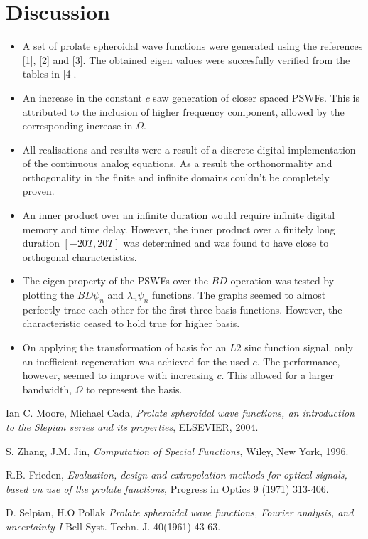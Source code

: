 \documentclass[a4paper,10pt]{article}
\begin{document}
\section*{Discussion}
\begin{itemize}
	\item{A set of prolate spheroidal wave functions were generated using the references [1], [2] and [3]. The obtained eigen values were succesfully verified from the tables in [4].}
	\item{An increase in the constant $c$ saw generation of closer spaced PSWFs. This is attributed to the inclusion of higher frequency component,  allowed by the corresponding increase in $\Omega$.}
	\item{All realisations and results were a result of a discrete digital implementation of the continuous analog equations. As a result the orthonormality and orthogonality in the finite and infinite domains couldn't be completely proven.}
	\item{An inner product over an infinite duration would require infinite digital memory and time delay. However, the inner product over a finitely long duration $[-20T,20T]$ was determined and was found to have close to orthogonal characteristics.}
	\item{The eigen property of the PSWFs over the $BD$ operation was tested by plotting the $BD \psi_n$ and $\lambda_n \psi_n$ functions. The graphs seemed to almost perfectly trace each other for the first three basis functions. However, the characteristic ceased to hold true for higher basis.}
	\item{On applying the transformation of basis for an $L2$ sinc function signal, only an inefficient regeneration was achieved for the used $c$. The performance, however, seemed to improve with increasing $c$. This allowed for a larger bandwidth, $\Omega$ to represent the basis.} 
\end{itemize}


\begin{thebibliography}{9}
  Ian C. Moore, Michael Cada,
  \textit{Prolate spheroidal wave functions, an introduction to the Slepian series and its properties},
  ELSEVIER,
  2004.

  S. Zhang, J.M. Jin,
  \textit{Computation of Special Functions},
  Wiley, New York, 1996.
  
  R.B. Frieden,
  \textit{Evaluation, design and extrapolation methods for optical signals, based on use of the prolate functions},
  Progress in Optics 9 (1971) 313-406.
  
	D. Selpian, H.O Pollak
	\textit{Prolate spheroidal wave functions, Fourier analysis, and uncertainty-I}
	Bell Syst. Techn. J. 40(1961) 43-63.
\end{thebibliography} 
\end{document}
